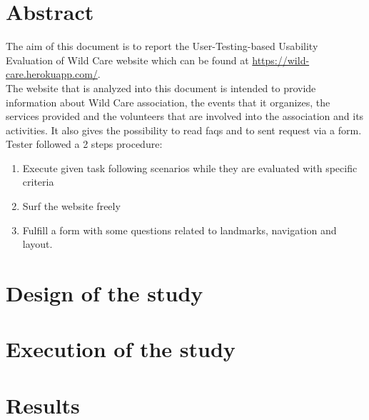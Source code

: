 \documentclass[11pt, a4paperm, hidelinks]{article}
\begin{document}
	\section{Abstract}
	The aim of this document is to report the User-Testing-based Usability Evaluation of Wild Care website which can be found at 	\url{https://wild-care.herokuapp.com/}.	\\ The website that is analyzed into this document is intended to provide 				information about Wild Care association, the events that it organizes, the services provided and the volunteers that are 			involved into the association and its activities. It also gives the possibility to read faqs and to sent request via a form.\\
 	Tester followed a 2 steps procedure:
	\begin{enumerate}
		\item Execute given task following scenarios while they are evaluated with specific criteria
		\item Surf the website freely
		\item Fulfill a form with some questions related to landmarks, navigation and layout.
	\end{enumerate}	

	\section{Design of the study}
	


	\section{Execution of the study}
	


	\section{Results}
	
\end{document}
